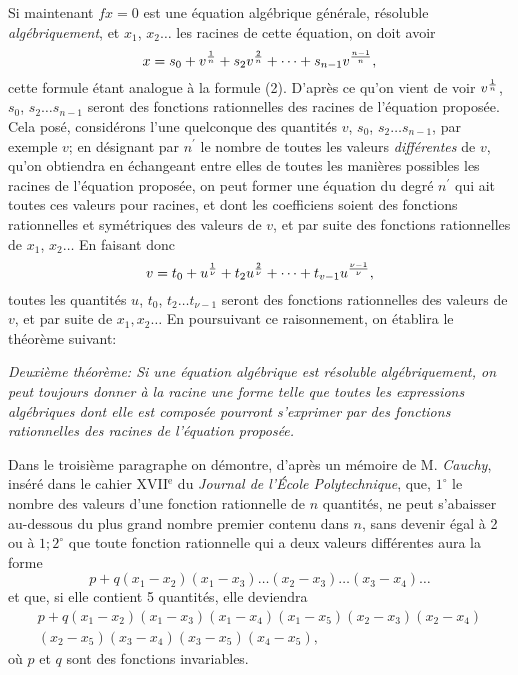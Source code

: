 \documentclass[oneside, 12 pt, leqno]{memoir}
\let\oldfrac\frac
\def\frac#1#2{\mathchoice{\text{\scalebox{.83}{${\oldfrac{#1}{#2}}$}}}{\text{\scalebox{.83}{${\displaystyle\oldfrac{#1}{#2}}$}}}{\genfrac{}{}{}{2}{#1}{#2}}{\genfrac{}{}{}{3}{#1}{#2}}}
\begin{document}
Si maintenant \(f x=0\) est une équation algébrique générale, résoluble \textit{algébriquement}, et \(x_1\), \(x_2 \dots\) les racines de cette équation, on doit avoir
\[x=s_0+v^{\frac{1}{n}}+s_2 v^{\frac{2}{n}}+\dots+s_{n-1} v^{\frac{n-1}{n}},\]
cette formule étant analogue à la formule (2). D'après ce qu'on vient de voir \(v^{\frac{1}{n}}\), \(s_0\), \(s_2 \dots s_{n-1}\) seront des fonctions rationnelles des racines de l'équation proposée. Cela posé, considérons l'une quelconque des quantités \(v\), \(s_0\), \(s_2 \dots s_{n-1}\), par exemple \(v\); en désignant par \(n^{\prime}\) le nombre de toutes les valeurs \textit{différentes} de \(v\), qu'on obtiendra en échangeant entre elles de toutes les manières possibles les racines de l'équation proposée, on peut former une équation du degré \(n^{\prime}\) qui ait toutes ces valeurs pour racines, et dont les coefficiens soient des fonctions rationnelles et symétriques des valeurs de \(v\), et par suite des fonctions rationnelles de \(x_1\), \(x_2 \dots\) En faisant donc
\[v=t_0+u^{\frac{1}{\nu}}+t_2 u^{\frac{2}{\nu}}+\dots+t_{v-1} u^{\frac{\nu-1}{\nu}},\]
toutes les quantités \(u\), \(t_0\), \(t_2 \dots t_{\nu-1}\) seront des fonctions rationnelles des valeurs de \(v\), et par suite de \(x_1, x_2 \dots\) En poursuivant ce raisonnement, on établira le théorème suivant:

\textit{Deuxième théorème: Si une équation algébrique est résoluble algébriquement, on peut toujours donner à la racine une forme telle que toutes les expressions algébriques dont elle est composée pourront s'exprimer par des fonctions rationnelles des racines de l'équation proposée.}

Dans le troisième paragraphe on démontre, d'après un mémoire de M. \textit{Cauchy}, inséré dans le cahier XVII\(^{\text{e}}\) du \textit{Journal de l'École Polytechnique}, que, \(1^{\circ}\) le nombre des valeurs d'une fonction rationnelle de \(n\) quantités, ne peut s'abaisser au-dessous du plus grand nombre premier contenu dans \(n\), sans devenir égal à 2 ou à \(1 ; 2^{\circ}\) que toute fonction rationnelle qui a deux valeurs différentes aura la forme
\[p+q\left(x_1-x_2\right)\left(x_1-x_3\right) \dots\left(x_2-x_3\right) \dots\left(x_3-x_4\right) \dots\]
et que, si elle contient 5 quantités, elle deviendra
\[\begin{gathered}
p+q\left(x_1-x_2\right)\left(x_1-x_3\right)\left(x_1-x_4\right)\left(x_1-x_5\right)\left(x_2-x_3\right)\left(x_2-x_4\right) \\
\left(x_2-x_5\right)\left(x_3-x_4\right)\left(x_3-x_5\right)\left(x_4-x_5\right),
\end{gathered}\]
où \(p\) et \(q\) sont des fonctions invariables.
\end{document}
